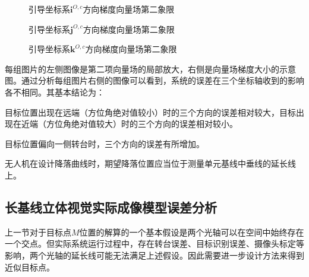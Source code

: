 \begin{figure}[htb]
	\centering
	 \qquad
	\caption{引导坐标系$\mathbf{i}^{O,c}$方向梯度向量场第二象限}
	\label{fig:chp03_vision_06_glide_3_x_with_theta_l_r_2_quadrant}
\end{figure}

\begin{figure}[htb]
	\centering
	 \qquad
	\caption{引导坐标系$\mathbf{j}^{O,c}$方向梯度向量场第二象限}
	\label{fig:chp03_vision_07_glide_3_y_with_theta_l_r_2_quadrant}
\end{figure}

\begin{figure}[htb]
	\centering
	 \qquad
	\caption{引导坐标系$\mathbf{k}^{O,c}$方向梯度向量场第二象限}
	\label{fig:chp03_vision_08_glide_3_z_with_theta_l_r_2_quadrant}
\end{figure}

每组图片的左侧图像是第二项向量场的局部放大，右侧是向量场梯度大小的示意图。通过分析每组图片右侧的图像可以看到，系统的误差在三个坐标轴收到的影响各不相同。其基本结论为：

\begin{compactenum}
	\item
	目标位置出现在远端（方位角绝对值较小）时的三个方向的误差相对较大，目标出现在近端（方位角绝对值较大）时的三个方向的误差相对较小。
	\item
	目标位置偏向一侧转台时，三个方向的误差有所增加。
	\item
	无人机在设计降落曲线时，期望降落位置应当位于测量单元基线中垂线的延长线上。
\end{compactenum}



\subsection{长基线立体视觉实际成像模型误差分析}
上一节对于目标点$M$位置的解算的一个基本假设是两个光轴可以在空间中始终存在一个交点。但实际系统运行过程中，存在转台误差、目标识别误差、摄像头标定等影响，两个光轴的延长线可能无法满足上述假设。因此需要进一步设计方法来得到近似目标点。

